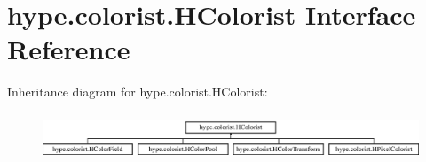 \hypertarget{interfacehype_1_1colorist_1_1_h_colorist}{\section{hype.\-colorist.\-H\-Colorist Interface Reference}
\label{interfacehype_1_1colorist_1_1_h_colorist}
}
Inheritance diagram for hype.\-colorist.\-H\-Colorist\-:\begin{figure}[H]
\begin{center}
\leavevmode
\includegraphics[height=1.443299cm]{interfacehype_1_1colorist_1_1_h_colorist}
\end{center}
\end{figure}
